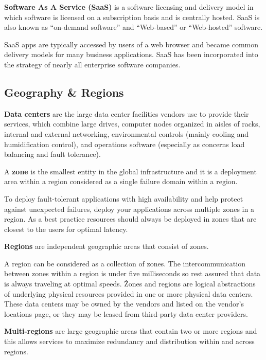 
\textbf{Software As A Service (SaaS)} is a software licensing and delivery model in which software is licensed on
a subscription basis and is centrally hosted. SaaS is also known as ``on-demand software'' and ``Web-based'' or
``Web-hosted'' software.
\ed


SaaS apps are typically accessed by users of a web browser and became common delivery models for many business
applications. SaaS has been incorporated into the strategy of nearly all enterprise software companies.

\subsection{Geography \& Regions}

\textbf{Data centers} are the large data center facilities vendors use to provide their services, which combine large
drives, computer nodes organized in aisles of racks, internal and external networking, environmental controls (mainly
cooling and humidification control), and operations software (especially as concerns load balancing and fault tolerance).
\ed

\bd[Zone]
A \textbf{zone} is the smallest entity in the global infrastructure and it is a deployment area within a region
considered as a single failure domain within a region.
\ed

To deploy fault-tolerant applications with high availability and help protect against unexpected failures, deploy
your applications across multiple zones in a region. As a best practice resources should always be deployed in zones
that are closest to the users for optimal latency.

\bd[Region]
\textbf{Regions} are independent geographic areas that consist of zones.
\ed

A region can be considered as a collection of zones. The intercommunication between zones within a region is under five
milliseconds so rest assured that data is always traveling at optimal speeds. \v

Zones and regions are logical abstractions of underlying physical resources provided in one or more physical data
centers. These data centers may be owned by the vendors and listed on the vendor's locations page, or they may be
leased from third-party data center providers.

\textbf{Multi-regions} are large geographic areas that contain two or more regions and this allows services to maximize
redundancy and distribution within and across regions.
\ed

